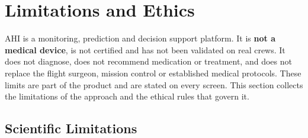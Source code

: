 \section{Limitations and Ethics}
\label{sec:limitations-ethics}

AHI is a monitoring, prediction and decision support platform. It is \textbf{not a medical device}, is not certified and has not been validated on real crews. It does not diagnose, does not recommend medication or treatment, and does not replace the flight surgeon, mission control or established medical protocols. These limits are part of the product and are stated on every screen. This section collects the limitations of the approach and the ethical rules that govern it.

\subsection{Scientific Limitations}
\label{subsec:scientific-limitations}

